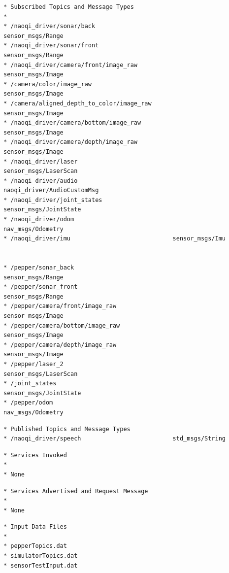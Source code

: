 \documentclass{CSSRforAfrica}
\newcommand{\checkboxChecked}{\fbox{\ding{51}}} %
\begin{document}
\begin{description}
\item[\checkboxChecked] 
 {\small 
\begin{verbatim}
* Subscribed Topics and Message Types
*
* /naoqi_driver/sonar/back                      sensor_msgs/Range                 
* /naoqi_driver/sonar/front                     sensor_msgs/Range
* /naoqi_driver/camera/front/image_raw          sensor_msgs/Image
* /camera/color/image_raw                       sensor_msgs/Image
* /camera/aligned_depth_to_color/image_raw      sensor_msgs/Image
* /naoqi_driver/camera/bottom/image_raw         sensor_msgs/Image
* /naoqi_driver/camera/depth/image_raw          sensor_msgs/Image
* /naoqi_driver/laser                           sensor_msgs/LaserScan
* /naoqi_driver/audio                           naoqi_driver/AudioCustomMsg
* /naoqi_driver/joint_states                    sensor_msgs/JointState
* /naoqi_driver/odom                            nav_msgs/Odometry
* /naoqi_driver/imu                             sensor_msgs/Imu


* /pepper/sonar_back                            sensor_msgs/Range
* /pepper/sonar_front                           sensor_msgs/Range
* /pepper/camera/front/image_raw                sensor_msgs/Image
* /pepper/camera/bottom/image_raw               sensor_msgs/Image
* /pepper/camera/depth/image_raw                sensor_msgs/Image
* /pepper/laser_2                               sensor_msgs/LaserScan
* /joint_states                                 sensor_msgs/JointState
* /pepper/odom                                  nav_msgs/Odometry
\end{verbatim}}

\item[\checkboxChecked] 
 {\small 
\begin{verbatim}                    
* Published Topics and Message Types
* /naoqi_driver/speech                          std_msgs/String
\end{verbatim}}

\item[\checkboxChecked]
{\small
\begin{verbatim} 
* Services Invoked
*
* None
\end{verbatim}}

\item[\checkboxChecked]
{\small
\begin{verbatim} 
* Services Advertised and Request Message
* 
* None
\end{verbatim}}

\item[\checkboxChecked] 
 {\small 
\begin{verbatim}
* Input Data Files
*
* pepperTopics.dat
* simulatorTopics.dat
* sensorTestInput.dat
\end{verbatim}}


\end{description}
\end{document}
